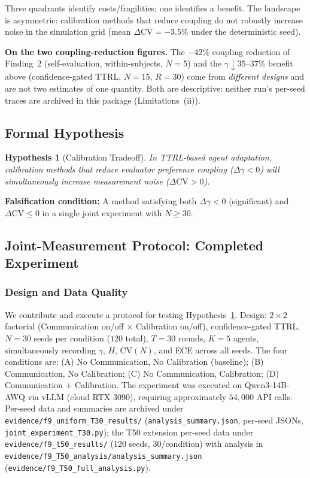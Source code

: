 \documentclass[11pt]{article}
\newcommand{\CV}{\ensuremath{\mathrm{CV}}}
\newtheorem{hypothesis}{Hypothesis}
\theoremstyle{definition}
\theoremstyle{remark}
\begin{document}
Three quadrants identify costs/fragilities; one identifies a benefit. The landscape is asymmetric: calibration methods that reduce coupling do not robustly increase noise in the simulation grid (mean $\Delta\CV = -3.5\%$ under the deterministic seed).

\textbf{On the two coupling-reduction figures.} The $-42\%$ coupling reduction of Finding~2 (self-evaluation, within-subjects, $N{=}5$) and the $\gamma \downarrow 35$--$37\%$ benefit above (confidence-gated TTRL, $N{=}15$, $R{=}30$) come from \emph{different designs} and are not two estimates of one quantity. Both are descriptive: neither run's per-seed traces are archived in this package (Limitations~(ii)).

\subsection{Formal Hypothesis}

\begin{hypothesis}[Calibration Tradeoff]\label{hyp:tradeoff}
In TTRL-based agent adaptation, calibration methods that reduce evaluator preference coupling ($\Delta\gamma < 0$) will simultaneously increase measurement noise ($\Delta\CV > 0$).
\end{hypothesis}

\textbf{Falsification condition:} A method satisfying both $\Delta\gamma < 0$ (significant) and $\Delta\CV \leq 0$ in a single joint experiment with $N \geq 30$.

\subsection{Joint-Measurement Protocol: Completed Experiment}\label{sec:joint}

\subsubsection{Design and Data Quality}

We contribute and execute a protocol for testing Hypothesis~\ref{hyp:tradeoff}. Design: $2 \times 2$ factorial (Communication on/off $\times$ Calibration on/off), confidence-gated TTRL, $N{=}30$ seeds per condition ($120$ total), $T{=}30$ rounds, $K{=}5$ agents, simultaneously recording $\gamma$, $H$, $\CV(N)$, and ECE across all seeds. The four conditions are: (A) No Communication, No Calibration (baseline); (B) Communication, No Calibration; (C) No Communication, Calibration; (D) Communication + Calibration. The experiment was executed on Qwen3-14B-AWQ via vLLM (cloud RTX 3090), requiring approximately $54{,}000$ API calls. Per-seed data and summaries are archived under \texttt{evidence/f9\_uniform\_T30\_results/} (\texttt{analysis\_summary.json}, per-seed JSONs, \texttt{joint\_experiment\_T30.py}); the T50 extension per-seed data under \texttt{evidence/f9\_t50\_results/} (120 seeds, 30/condition) with analysis in \texttt{evidence/f9\_T50\_analysis/analysis\_summary.json} (\texttt{evidence/f9\_T50\_full\_analysis.py}).
\end{document}
